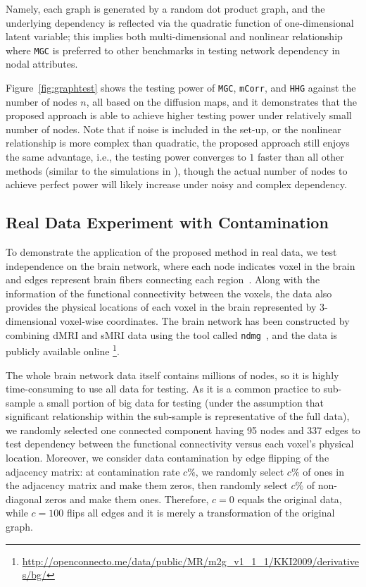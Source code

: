 \documentclass[12pt]{article}
\theoremstyle{definition}
\begin{document}
	Namely, each graph is generated by a random dot product graph, and the underlying dependency is reflected via the quadratic function of one-dimensional latent variable; this implies both multi-dimensional and nonlinear relationship where \texttt{MGC} is preferred to other benchmarks in testing network dependency in nodal attributes.  
	
	Figure~\ref{fig:graphtest} shows the testing power of \texttt{MGC}, \texttt{mCorr}, and \texttt{HHG} against the number of nodes $n$, all based on the diffusion maps, and it demonstrates that the proposed approach is able to achieve higher testing power under relatively small number of nodes. Note that if noise is included in the set-up, or the nonlinear relationship is more complex than quadratic, the proposed approach still enjoys the same advantage, i.e., the testing power converges to $1$ faster than all other methods (similar to the simulations in \cite{shen2016discovering}), though the actual number of nodes to achieve perfect power will likely increase under noisy and complex dependency.
	
	
	\subsection{Real Data Experiment with Contamination}
	\label{ssec:real}
	
	To demonstrate the application of the proposed method in real data, we test independence on the brain network, where each node indicates voxel in the brain and edges represent brain fibers connecting each region~\citep{kiar2016ndmg}. Along with the information of the functional connectivity between the voxels, the data also provides the physical locations of each voxel in the brain represented by 3-dimensional voxel-wise coordinates. The brain network has been constructed by combining dMRI and sMRI data using the tool called \texttt{ndmg}~\citep{kiar2016science}, and the data is publicly available online \footnote{\url{http://openconnecto.me/data/public/MR/m2g_v1_1_1/KKI2009/derivatives/bg/}}.
	
	The whole brain network data itself contains millions of nodes, so it is highly time-consuming to use all data for testing. As it is a common practice to sub-sample a small portion of big data for testing (under the assumption that significant relationship within the sub-sample is representative of the full data), we randomly selected one connected component having 95 nodes and 337 edges to test dependency between the functional connectivity versus each voxel's physical location. Moreover, we consider data contamination by edge flipping of the adjacency matrix: at contamination rate $c \%$, we randomly select $c \%$ of ones in the adjacency matrix and make them zeros, then randomly select $c \%$ of non-diagonal zeros and make them ones. Therefore, $c=0$ equals the original data, while $c=100$ flips all edges and it is merely a transformation of the original graph.
	
\end{document}
